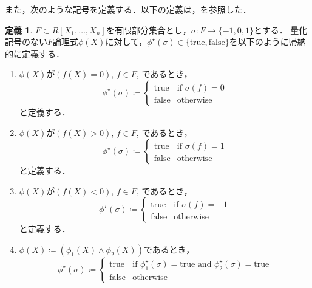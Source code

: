 \documentclass[uplatex, dvipdfmx]{jsarticle}
\numberwithin{equation}{section}
\newcommand{\map}[3]{{#1}\colon{#2}\rightarrow{#3}}
\newcommand{\true}{\text{true}}
\newcommand{\false}{\text{false}}
\theoremstyle{definition}
\newtheorem{definition}{定義}[section]
\begin{document}
また，次のような記号を定義する．以下の定義は，\cite[Notation 11.12.]{MR2248869}を参照した．
\begin{definition}
     $F \subset R[X_1, \dots, X_n]$を有限部分集合とし，$\map{\sigma}{F}{\{-1, 0, 1\}}$とする．
     量化記号のない$F$論理式$\phi(X)$に対して，$\phi^\star(\sigma) \in \{\true, \false\}$を以下のように帰納的に定義する．
     \begin{enumerate}
          \item $\phi(X)$が$(f(X)=0)$, $f \in F$, であるとき，
          \begin{equation}
               \phi^\star(\sigma)\coloneqq \begin{cases}
                    \true  & \text{if $\sigma(f)=0$}\\
                    \false & \text{otherwise}
               \end{cases}
          \end{equation}
          と定義する．
          \item $\phi(X)$が$(f(X)>0)$, $f \in F$, であるとき，
          \begin{equation}
               \phi^\star(\sigma)\coloneqq \begin{cases}
                    \true  & \text{if $\sigma(f)=1$}\\
                    \false & \text{otherwise}
               \end{cases}
          \end{equation}
          と定義する．
          \item $\phi(X)$が$(f(X)<0)$, $f \in F$, であるとき，
          \begin{equation}
               \phi^\star(\sigma)\coloneqq \begin{cases}
                    \true  & \text{if $\sigma(f)=-1$}\\
                    \false & \text{otherwise}
               \end{cases}
          \end{equation}
          と定義する．
          \item $\phi(X)\coloneqq (\phi_1(X) \land \phi_2(X))$であるとき，
          \begin{equation}
               \phi^\star(\sigma)\coloneqq \begin{cases}
                    \true  & \text{if $\phi_1^\star(\sigma)=\true$ and $\phi_2^\star(\sigma)=\true$}\\
                    \false & \text{otherwise}
               \end{cases}

\end{equation}
\end{enumerate}
\end{definition}
\end{document}
